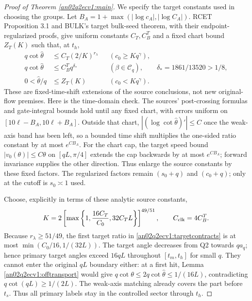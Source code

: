 \documentclass[11pt]{article}
\theoremstyle{remark}\newtheorem{remark}[theorem]{Remark}
\newcommand{\Cl}{\mathcal C_q}
\begin{document}
\begin{proof}[Proof of Theorem \ref{an02q2ecv1:main}]
We specify the target constants used in choosing the groups.
Let $B_A=1+\max(|\log c_A|,|\log C_A|)$.
RCET Proposition 3.1 and BULK's target bulk-seed theorem, with
their endpoint-regularized proofs, give uniform constants $C_T,C_B^T$
and a fixed chart bound $Z_T(K)$ such that, at $t_h$,
\begin{align}
 q\cot\widehat\theta&\le C_T(2/K)^{r_\lambda}
       &&(c_0\ge Kq^\gamma),\nonumber\\
 q\cot\widehat\theta&\le C_B^T q^{\delta_*}
       &&(\beta\in\Cl),\qquad \delta_*=1861/13520>1/8,\nonumber\\
 0<\widehat\theta/q&\le Z_T(K)
       &&(c_0<Kq^\gamma).
 \label{an02q2ecv1:targetcontracts}
\end{align}
These are fixed-time-shift extensions of the source conclusions,
not new original-flow premises. Here is the time-domain check.
The sources' post-crossing formulas and gate-integral bounds
hold until any fixed chart, with errors uniform on
$[10\ell-B_A,10\ell+B_A]$. Outside that chart,
$|(\log\cot\widehat\theta)'|\le C$ once the weak-axis band
has been left, so a bounded time shift multiplies the one-sided
ratio constant by at most $e^{CB_A}$.
For the chart cap, the target speed bound $|v_0(\theta)|\le C\theta$
on $[qL,\pi/4]$ extends the cap backwards by at most $e^{CB_A}$;
forward invariance supplies the other direction.
Thus enlarge the source constants by these fixed factors.
The regularized factors remain $(s_0+q)$ and $(c_0+q)$;
only at the cutoff is $s_0\asymp1$ used.

Choose, explicitly in terms of these analytic source constants,
\begin{equation}
 K=2\left[\max\left\{1,\frac{16C_T}{C_0},32C_TL\right\}
       \right]^{49/51},\qquad
 C_{\rm clk}=4C_B^T .
 \label{an02q2ecv1:constants}
\end{equation}
Because $r_\lambda\ge51/49$, the first target ratio in
\eqref{an02q2ecv1:targetcontracts} is at most
$\min(C_0/16,1/(32L))$.
The target angle decreases from Q2 towards $qa_q$;
hence primary target angles exceed $16qL$ throughout
$[t_m,t_h]$ for small $q$.
They cannot enter the original $qL$ boundary either:
at a first hit, Lemma \ref{an02q2ecv1:offtransport} would give
$q\cot\theta\le2q\cot\widehat\theta\le1/(16L)$,
contradicting $q\cot(qL)\ge1/(2L)$.
The weak-axis matching already covers the part before $t_s$.
Thus all primary labels stay in the controlled sector through $t_h$.


\end{proof}
\end{document}

